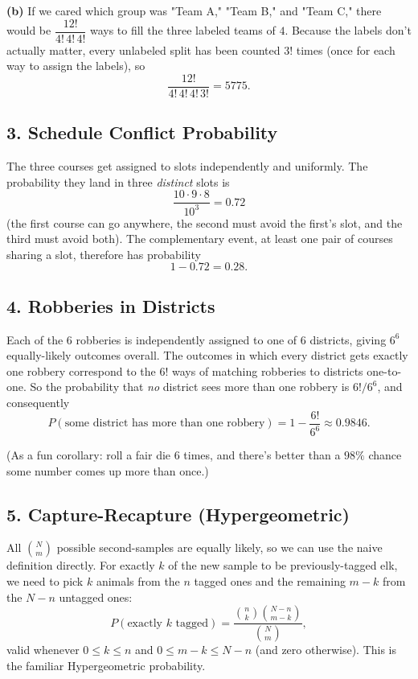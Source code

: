 \documentclass{article}
\begin{document}
\medskip
\textbf{(b)} If we cared which group was "Team A," "Team B," and "Team C," there would be $\dfrac{12!}{4!\,4!\,4!}$ ways to fill the three labeled teams of $4$. Because the labels don't actually matter, every unlabeled split has been counted $3!$ times (once for each way to assign the labels), so
$$\frac{12!}{4!\,4!\,4!\,3!} = 5775.$$

\subsection*{3. Schedule Conflict Probability}

The three courses get assigned to slots independently and uniformly. The probability they land in three \emph{distinct} slots is
$$\frac{10 \cdot 9 \cdot 8}{10^3} = 0.72$$
(the first course can go anywhere, the second must avoid the first's slot, and the third must avoid both). The complementary event, at least one pair of courses sharing a slot, therefore has probability
$$1 - 0.72 = 0.28.$$

\subsection*{4. Robberies in Districts}

Each of the $6$ robberies is independently assigned to one of $6$ districts, giving $6^6$ equally-likely outcomes overall. The outcomes in which every district gets exactly one robbery correspond to the $6!$ ways of matching robberies to districts one-to-one. So the probability that \emph{no} district sees more than one robbery is $6!/6^6$, and consequently
$$P(\text{some district has more than one robbery}) = 1 - \frac{6!}{6^6} \approx 0.9846.$$

(As a fun corollary: roll a fair die $6$ times, and there's better than a $98\%$ chance some number comes up more than once.)

\subsection*{5. Capture-Recapture (Hypergeometric)}

All $\binom{N}{m}$ possible second-samples are equally likely, so we can use the naive definition directly. For exactly $k$ of the new sample to be previously-tagged elk, we need to pick $k$ animals from the $n$ tagged ones and the remaining $m-k$ from the $N-n$ untagged ones:
$$
P(\text{exactly } k \text{ tagged}) = \frac{\binom{n}{k}\binom{N-n}{m-k}}{\binom{N}{m}},
$$
valid whenever $0 \le k \le n$ and $0 \le m-k \le N-n$ (and zero otherwise). This is the familiar Hypergeometric probability.
\end{document}
